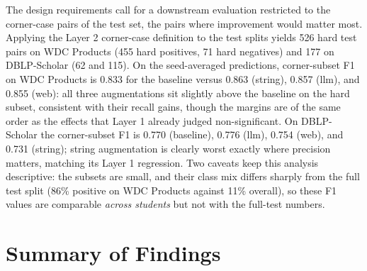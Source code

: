 \documentclass[a4paper,oneside,bibliography=totoc]{scrbook}
\begin{document}
The design requirements call for a downstream evaluation restricted to the corner-case pairs of the test set, the pairs where improvement would matter most. Applying the Layer 2 corner-case definition to the test splits yields 526 hard test pairs on WDC Products (455 hard positives, 71 hard negatives) and 177 on DBLP-Scholar (62 and 115). On the seed-averaged predictions, corner-subset F1 on WDC Products is 0.833 for the baseline versus 0.863 (string), 0.857 (llm), and 0.855 (web): all three augmentations sit slightly above the baseline on the hard subset, consistent with their recall gains, though the margins are of the same order as the effects that Layer 1 already judged non-significant. On DBLP-Scholar the corner-subset F1 is 0.770 (baseline), 0.776 (llm), 0.754 (web), and 0.731 (string); string augmentation is clearly worst exactly where precision matters, matching its Layer 1 regression. Two caveats keep this analysis descriptive: the subsets are small, and their class mix differs sharply from the full test split (86\% positive on WDC Products against 11\% overall), so these F1 values are comparable \emph{across students} but not with the full-test numbers.

\section{Summary of Findings}
\label{sec:results_summary}
\end{document}
